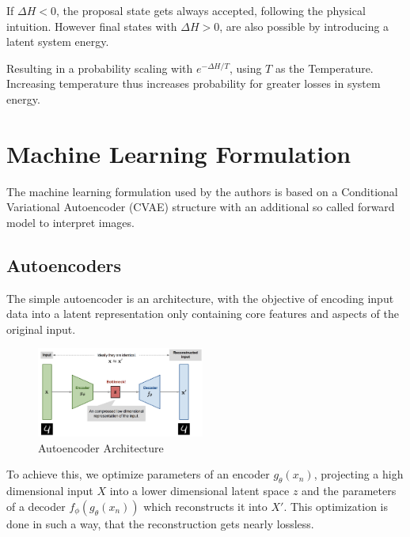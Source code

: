 \documentclass[a4paper,10pt,twocolumn]{article}
\begin{document}
        If $\Delta H < 0$, the proposal state gets always accepted, following the physical intuition.
        However final states with $\Delta H > 0$, are also possible by introducing a latent system energy.
        
        Resulting in a probability scaling with $e^{-\Delta H / T}$, using $T$ as the Temperature.
        Increasing temperature thus increases probability for greater losses in system energy. 


    \section{Machine Learning Formulation}

        The machine learning formulation used by the authors is based on a Conditional Variational Autoencoder (CVAE) structure with 
        an additional so called forward model to interpret images\cite{minartz_cpm}. 

        \subsection{Autoencoders}
            The simple autoencoder is an architecture, with the 
            objective of encoding input data into a latent representation only 
            containing core features and aspects of the original input\cite{weng_autocoders}.
            
            \begin{figure}[H]
                \centering
                \includegraphics[width=0.49\textwidth]{../images/autoencoder-architecture.png}
                \caption{Autoencoder Architecture}\label{fig:autoencoder}
            \end{figure}

            To achieve this, we optimize parameters of an encoder $g_{\theta} ({x_n})$, 
            projecting a high dimensional input $X$ into a lower dimensional latent space $z$ 
            and the parameters of a decoder $f_{\phi} (g_{\theta} ({x_n}))$ which reconstructs it into $X'$.
            This optimization is done in such a way, that the reconstruction gets nearly lossless.
\end{document}
